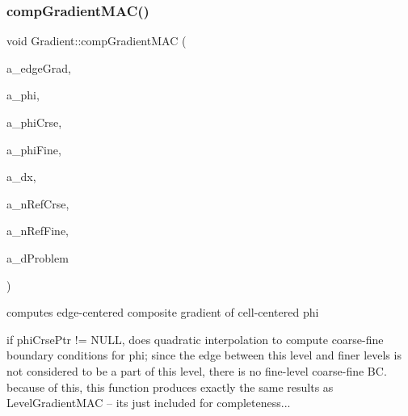\subsubsection{\texorpdfstring{comp\+Gradient\+M\+A\+C()}{compGradientMAC()}\hspace{0.1cm}{\footnotesize\ttfamily [2/3]}}
{\footnotesize\ttfamily void Gradient\+::comp\+Gradient\+M\+AC (\begin{DoxyParamCaption}\item[{\textbf{ Level\+Data}$<$ \textbf{ Flux\+Box} $>$ \&}]{a\+\_\+edge\+Grad,  }\item[{\textbf{ Level\+Data}$<$ \textbf{ F\+Array\+Box} $>$ \&}]{a\+\_\+phi,  }\item[{const \textbf{ Level\+Data}$<$ \textbf{ F\+Array\+Box} $>$ $\ast$}]{a\+\_\+phi\+Crse,  }\item[{const \textbf{ Level\+Data}$<$ \textbf{ F\+Array\+Box} $>$ $\ast$}]{a\+\_\+phi\+Fine,  }\item[{const \textbf{ Real}}]{a\+\_\+dx,  }\item[{const int}]{a\+\_\+n\+Ref\+Crse,  }\item[{const int}]{a\+\_\+n\+Ref\+Fine,  }\item[{const \textbf{ Problem\+Domain} \&}]{a\+\_\+d\+Problem }\end{DoxyParamCaption})\hspace{0.3cm}{\ttfamily [static]}}



computes edge-\/centered composite gradient of cell-\/centered phi 

if phi\+Crse\+Ptr != N\+U\+LL, does quadratic interpolation to compute coarse-\/fine boundary conditions for phi; since the edge between this level and finer levels is not considered to be a part of this level, there is no fine-\/level coarse-\/fine BC. because of this, this function produces exactly the same results as Level\+Gradient\+M\+AC -- it\textquotesingle{}s just included for completeness... \mbox{\label{class_gradient_a82e5e91499de8d5cbddf3c42528c9421}} 
